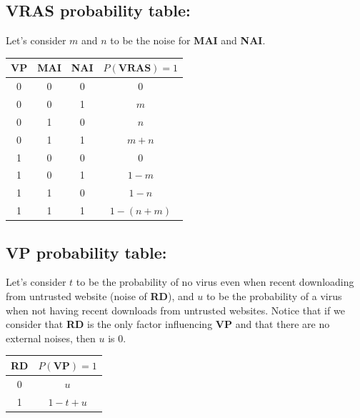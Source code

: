 \documentclass{article}
\begin{document}
\begin{enumerate}[(a)]
                \subsection*{VRAS probability table:}
                Let's consider $m$ and $n$ to be the noise for \textbf{MAI} and \textbf{NAI}.
                \begin{center}
                   \begin{tabular}{|c|c|c|c|} \hline
                        \textbf{VP} & \textbf{MAI} & \textbf{NAI} & \textbf{$P(\textbf{VRAS})=1$} \\ \hline
                        0 & 0 & 0 & 0 \\ \hline
                        0 & 0 & 1 & $m$ \\ \hline
                        0 & 1 & 0 & $n$ \\ \hline
                        0 & 1 & 1 & $m+n$\\ \hline
                        1 & 0 & 0 & 0 \\ \hline
                        1 & 0 & 1 & $1-m$\\ \hline
                        1 & 1 & 0 & $1-n$\\ \hline
                        1 & 1 & 1 & $1-(n+m)$\\ \hline
                        
                    \end{tabular}
                \end{center}

                \subsection*{VP probability table:}
                Let's consider $t$ to be the probability of no virus even when recent downloading from untrusted website (noise of \textbf{RD}), and $u$ to be the probability of a virus when not having recent downloads from untrusted websites. Notice that if we consider that \textbf{RD} is the only factor influencing \textbf{VP} and that there are no external noises, then $u$ is $0$. 
                \begin{center}
                   \begin{tabular}{|c|c|} \hline
                        \textbf{RD} & $P(\textbf{VP})=1$  \\ \hline
                        0 & $u$ \\ \hline
                        1 & $1-t+u$\\ \hline
                        

\end{tabular}
\end{center}
\end{enumerate}
\end{document}
